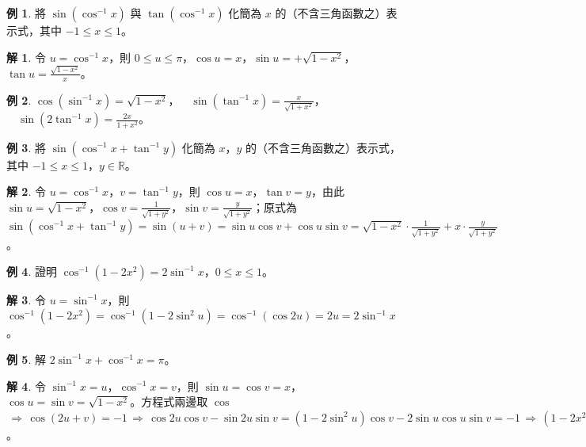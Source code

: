 \documentclass[12pt]{extarticle}
\newcommand{\ds}{\displaystyle}
\newcommand{\ie}{\,\Longrightarrow\,}
\theoremstyle{definition}
\newtheorem*{ex}{例}
\newtheorem*{sol}{解}
\begin{document}
\begin{ex}
  將 $\ds\sin(\cos^{-1} x)$ 與 $\tan(\cos^{-1} x)$ 化簡為 $x$ 的（不含三角函數之）表示式，其中 $-1\leqslant x\leqslant 1$。
\end{ex}

\begin{sol}
  令 $\ds u =\cos^{-1}x$，則 $\ds0\leqslant u\leqslant\pi$，$\cos u = x$，$\ds\sin u = +\sqrt{1 - x^2}$，$\ds\tan u = \frac{\sqrt{1 - x^2}}{x}$。
\end{sol}

\begin{ex} 
  $\ds\cos(\sin^{-1} x) = \sqrt{1 - x^2}$，$\ds\quad\sin(\tan^{-1} x) = \frac{x}{\sqrt{1 + x^2}}$，$\ds\quad\sin(2\tan^{-1} x) = \frac{2x}{1 + x^2}$。
\end{ex}

\begin{ex}
  將 $\ds \sin(\cos^{-1} x + \tan^{-1}y)$ 化簡為 $x$，$y$ 的（不含三角函數之）表示式，其中 $-1\leqslant x\leqslant 1$，$y\in\mathbb{R}$。
\end{ex}

\begin{sol}
  令 $\ds u =\cos^{-1}x$，$\ds v=\tan^{-1} y$，則 $\cos u = x$，$\tan v = y$，由此 $\ds\sin u = \sqrt{1 - x^2}$，$\ds\cos v = \frac{1}{\sqrt{1 + y^2}}$，$\ds\sin v = \frac{y}{\sqrt{1 + y^2}}$；原式為 $\ds\sin(\cos^{-1} x + \tan^{-1}y) = \sin(u + v) = \sin u\cos v + \cos u\sin v = \sqrt{1 - x^2}\cdot\frac{1}{\sqrt{1 + y^2}} + x\cdot\frac{y}{\sqrt{1 + y^2}}$。
\end{sol}

\begin{ex}
  證明 $\ds\cos^{-1}(1 - 2x^2) = 2\sin^{-1}x$，$0\leqslant x\leqslant 1$。
\end{ex}

\begin{sol}
  令 $\ds u = \sin^{-1}x$，則 $\ds\cos^{-1}(1 - 2x^2) = \cos^{-1}(1 - 2\sin^2u) = \cos^{-1}(\cos 2u) = 2u = 2\sin^{-1}x$。
\end{sol}

\begin{ex}
  解 $\ds2\sin^{-1} x + \cos^{-1}x = \pi$。
\end{ex}

\begin{sol}
  令 $\ds\sin^{-1}x = u$，$\ds\cos^{-1}x = v$，則 $\ds\sin u = \cos v = x$，$\ds\cos u = \sin v = \sqrt{1 - x^2}$。方程式兩邊取 $\cos$ $\ds\ie\cos(2u + v) = -1 \ie \cos2u\cos v - \sin2u\sin v = (1 - 2\sin^2u)\cos v - 2\sin u\cos u\sin v = -1 \ie (1 - 2x^2)x - 2 x(1 - x^2) = -1 \ie x = 1$。
\end{sol}
\end{document}
